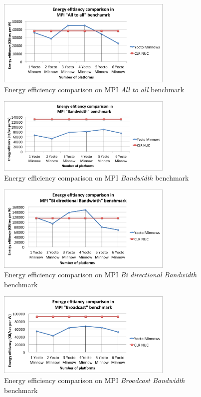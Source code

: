 \begin{figure}[H]
\centering
\includegraphics[width=0.75\textwidth]{images/energy_results/all_to_all.png}
\caption{Energy efficiency comparison on MPI \textit{All to all} benchmark}
\label{alltoall_energy}
\end{figure}


\begin{figure}[H]
\centering
\includegraphics[width=0.75\textwidth]{images/energy_results/bandwidth.png}
\caption{Energy efficiency comparison on MPI \textit{Bandwidth} benchmark}
\label{bandwidth_energy}
\end{figure}

\begin{figure}[H]
\centering
\includegraphics[width=0.75\textwidth]{images/energy_results/bibw.png}
\caption{Energy efficiency comparison on MPI \textit{Bi directional Bandwidth} benchmark}
\label{bibw_energy}
\end{figure}


\begin{figure}[H]
\centering
\includegraphics[width=0.75\textwidth]{images/energy_results/broadcast.png}
\caption{Energy efficiency comparison on MPI \textit{Broadcast Bandwidth} benchmark}
\label{broadcast_energy}
\end{figure}


\clearpage

